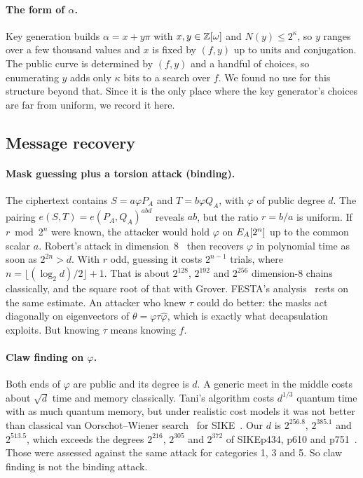 \paragraph{The form of $\alpha$.} Key generation builds
$\alpha=x+y\pi$ with $x,y\in\mathbb{Z}[\omega]$ and $N(y)\le 2^\kappa$, so
$y$ ranges over a few thousand values and $x$ is fixed by $(f,y)$ up to units
and conjugation. The public curve is determined by $(f,y)$ and a handful of
choices, so enumerating $y$ adds only $\kappa$ bits to a search over $f$. We
found no use for this structure beyond that. Since it is the only place where
the key generator's choices are far from uniform, we record it here.

\subsection{Message recovery}\label{sec:msg}

\paragraph{Mask guessing plus a torsion attack (binding).} The ciphertext
contains $S=a\varphi P_A$ and $T=b\varphi Q_A$, with $\varphi$ of public
degree $d$. The pairing $e(S,T)=e(P_A,Q_A)^{abd}$ reveals $ab$, but the
ratio $r=b/a$ is uniform. If $r\bmod 2^n$ were known, the attacker would hold
$\varphi$ on $E_A[2^n]$ up to the common scalar $a$. Robert's attack in
dimension~8~\cite{Rob23} then recovers $\varphi$ in polynomial time as soon
as $2^{2n}>d$. With $r$ odd, guessing it costs $2^{n-1}$ trials,
where $n=\lfloor(\log_2d)/2\rfloor+1$. That is about $2^{128}$, $2^{192}$ and
$2^{256}$ dimension-8 chains classically, and the square root of that with Grover.
FESTA's analysis~\cite{BMP23} rests on the same estimate. An attacker who
knew $\tau$ could do better: the masks act diagonally on eigenvectors of
$\theta=\varphi\tau\hat\varphi$, which is exactly what decapsulation
exploits. But knowing $\tau$ means knowing $f$.

\paragraph{Claw finding on $\varphi$.} Both ends of $\varphi$ are public and
its degree is $d$. A generic meet in the middle costs about $\sqrt d$ time
and memory classically. Tani's algorithm costs $d^{1/3}$ quantum time with
as much quantum memory, but under realistic cost models it was not better
than classical van Oorschot--Wiener search~\cite{vOW99} for SIKE~\cite{JS19}. Our $d$ is
$2^{256.8}$, $2^{385.1}$ and $2^{513.5}$, which exceeds the degrees
$2^{216}$, $2^{305}$ and $2^{372}$ of SIKEp434, p610 and p751~\cite{SIKE}.
Those were assessed against the same attack for categories 1, 3 and 5. So
claw finding is not the binding attack.

